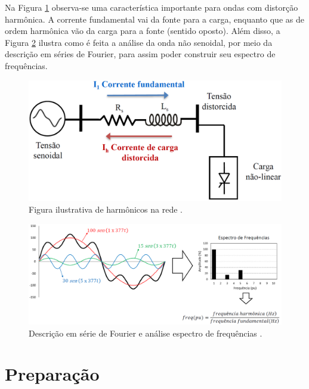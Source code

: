 \documentclass[a4paper,12pt,oneside,openany,table,xcdraw]{article}
\begin{document}
Na Figura \ref{intro:fig1} observa-se uma característica importante para ondas com distorção harmônica. A corrente fundamental vai da fonte para a carga, enquanto que as de ordem harmônica vão da carga para a fonte (sentido oposto). Além disso, a Figura \ref{intro:fig2} ilustra como é feita a análise da onda não senoidal, por meio da descrição em séries de Fourier, para assim poder construir seu espectro de frequências.

\vspace{1.1cm}
\begin{figure}[H]
\hspace{0.4cm}
\centering
\includegraphics[width=12.5cm]{harmonicos}
\caption{Figura ilustrativa de harmônicos na rede \cite{PH}.}
\label{intro:fig1}
\end{figure}

\begin{figure}[H]
\hspace{0.4cm}
\centering
\includegraphics[width=12.5cm]{espectro}
\caption{Descrição em série de Fourier  e análise espectro de frequências \cite{PH}.}
\label{intro:fig2}
\end{figure}
\vspace{0.3cm}

\section{Preparação}
\end{document}

